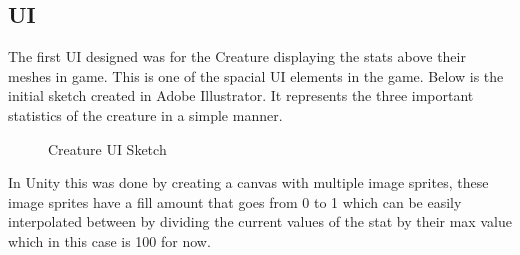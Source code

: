 \documentclass[11pt]{report}
\begin{document}
\subsection{UI}
The first UI designed was for the Creature displaying the stats above their meshes in game. This is one of the spacial UI elements in the game. Below is the initial sketch created in Adobe Illustrator. It represents the three important statistics of the creature in a simple manner.

\begin{figure}[H]
    \centering
    \caption{Creature UI Sketch}
\end{figure}

In Unity this was done by creating a canvas with multiple image sprites, these image sprites have a fill amount that goes from 0 to 1 which can be easily interpolated between by dividing the current values of the stat by their max value which in this case is 100 for now.
\end{document}
